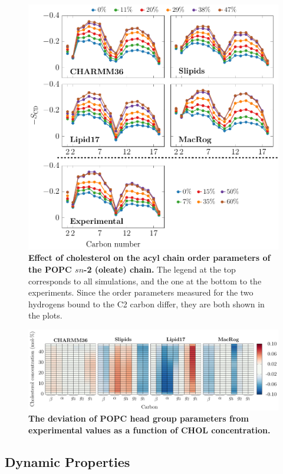 \documentclass[journal=jpcbfk]{achemso}
\begin{document}
\begin{figure}[htb!]
    \centering
    \includegraphics[width=0.9\linewidth]{../FIGS/oleate.pdf}
    \caption{\label{SIfig:oleate}%
     \textbf{Effect of cholesterol on the acyl chain order parameters of the POPC $sn$-2 (oleate) chain.}
     The legend at the top corresponds to all simulations, and the one at the bottom to the experiments. Since the order parameters measured for the two hydrogens bound to the C2 carbon differ, they are both shown in the plots.
    }
\end{figure}

\begin{figure}[htb!]
    \centering
    \includegraphics[width=\linewidth]{../FIGS/OP_headgroup.pdf}
    \caption{\label{SIfig:headgroups}%
     \textbf{The deviation of POPC head group parameters from experimental values as a function of CHOL concentration.}
    }
\end{figure}

\clearpage
\subsection{Dynamic Properties}
\end{document}
